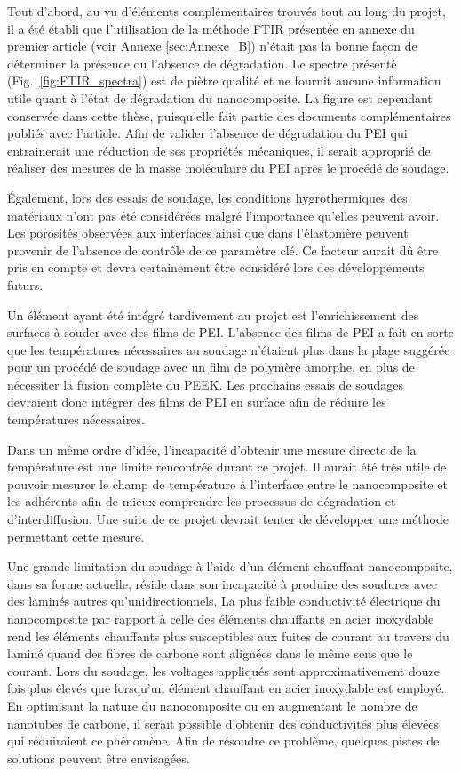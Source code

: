 Tout d'abord, au vu d'éléments complémentaires trouvés tout au long du projet, il a été établi que l'utilisation de la méthode FTIR présentée en annexe du premier article (voir Annexe \ref{sec:Annexe_B}) n'était pas la bonne façon de déterminer la présence ou l'absence de dégradation. 
Le spectre présenté (Fig.~\ref{fig:FTIR_spectra}) est de piètre qualité et ne fournit aucune information utile quant à l'état de dégradation du nanocomposite. 
La figure est cependant conservée dans cette thèse, puisqu'elle fait partie des documents complémentaires publiés avec l'article. 
Afin de valider l'absence de dégradation du PEI qui entrainerait une réduction de ses propriétés mécaniques, il serait approprié de réaliser des mesures de la masse moléculaire du PEI après le procédé de soudage. 

Également, lors des essais de soudage, les conditions hygrothermiques des matériaux n'ont pas été considérées malgré l'importance qu'elles peuvent avoir. 
Les porosités observées aux interfaces ainsi que dans l'élastomère peuvent provenir de l'absence de contrôle de ce paramètre clé. 
Ce facteur aurait dû être pris en compte et devra certainement être considéré lors des développements futurs. 

Un élément ayant été intégré tardivement au projet est l'enrichissement des surfaces à souder avec des films de PEI. 
L'absence des films de PEI a fait en sorte que les températures nécessaires au soudage n'étaient plus dans la plage suggérée pour un procédé de soudage avec un film de polymère amorphe, en plus de nécessiter la fusion complète du PEEK. 
Les prochains essais de soudages devraient donc intégrer des films de PEI en surface afin de réduire les températures nécessaires.  

Dans un même ordre d'idée, l'incapacité d'obtenir une mesure directe de la température est une limite rencontrée durant ce projet. 
Il aurait été très utile de pouvoir mesurer le champ de température à l'interface entre le nanocomposite et les adhérents afin de mieux comprendre les processus de dégradation et d'interdiffusion. 
Une suite de ce projet devrait tenter de développer une méthode permettant cette mesure. 

Une grande limitation du soudage à l'aide d'un élément chauffant nanocomposite, dans sa forme actuelle, réside dans son incapacité à produire des soudures avec des laminés autres qu'unidirectionnels. 
La plus faible conductivité électrique du nanocomposite par rapport à celle des éléments chauffants en acier inoxydable rend les éléments chauffants plus susceptibles aux fuites de courant au travers du laminé quand des fibres de carbone sont alignées dans le même sens que le courant. 
Lors du soudage, les voltages appliqués sont approximativement douze fois plus élevés que lorsqu'un élément chauffant en acier inoxydable est employé. 
En optimisant la nature du nanocomposite ou en augmentant le nombre de nanotubes de carbone, il serait possible d'obtenir des conductivités plus élevées qui réduiraient ce phénomène. 
Afin de résoudre ce problème, quelques pistes de solutions peuvent être envisagées. 

